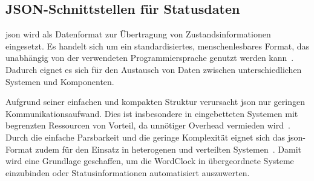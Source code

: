 \subsection{JSON-Schnittstellen für Statusdaten}
\gls{json} wird als Datenformat zur Übertragung von Zustandsinformationen eingesetzt.
Es handelt sich um ein standardisiertes, menschenlesbares Format, das unabhängig von der verwendeten Programmiersprache genutzt werden kann~\cite{wehner_json_iot}.
Dadurch eignet es sich für den Austausch von Daten zwischen unterschiedlichen Systemen und Komponenten.

Aufgrund seiner einfachen und kompakten Struktur verursacht \gls{json} nur geringen Kommunikationsaufwand.
Dies ist insbesondere in eingebetteten Systemen mit begrenzten Ressourcen von Vorteil, da unnötiger Overhead vermieden wird~\cite{wehner_json_iot}.
Durch die einfache Parsbarkeit und die geringe Komplexität eignet sich das \gls{json}-Format zudem für den Einsatz in heterogenen und verteilten Systemen~\cite{wehner_json_iot}.
Damit wird eine Grundlage geschaffen, um die WordClock in übergeordnete Systeme einzubinden oder Statusinformationen automatisiert auszuwerten.